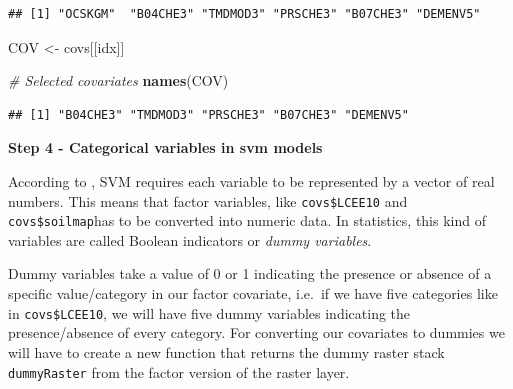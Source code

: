 \documentclass[10pt,b5paper,]{book}
\newenvironment{Shaded}{\begin{snugshade}}{\end{snugshade}}
\newcommand{\CommentTok}[1]{\textcolor[rgb]{0.56,0.35,0.01}{\textit{#1}}}
\newcommand{\DecValTok}[1]{\textcolor[rgb]{0.00,0.00,0.81}{#1}}
\newcommand{\KeywordTok}[1]{\textcolor[rgb]{0.13,0.29,0.53}{\textbf{#1}}}
\newcommand{\NormalTok}[1]{#1}
\newcommand{\OperatorTok}[1]{\textcolor[rgb]{0.81,0.36,0.00}{\textbf{#1}}}
\newcommand{\OtherTok}[1]{\textcolor[rgb]{0.56,0.35,0.01}{#1}}
\newcommand{\StringTok}[1]{\textcolor[rgb]{0.31,0.60,0.02}{#1}}
\theoremstyle{definition}
\theoremstyle{definition}
\theoremstyle{definition}
\theoremstyle{remark}
\begin{document}
\begin{Shaded}
\end{Shaded}

\begin{verbatim}
## [1] "OCSKGM"  "B04CHE3" "TMDMOD3" "PRSCHE3" "B07CHE3" "DEMENV5"
\end{verbatim}

\begin{Shaded}
\begin{Highlighting}[]
\NormalTok{COV <-}\StringTok{ }\NormalTok{covs[[idx]]}

\CommentTok{# Selected covariates}
\KeywordTok{names}\NormalTok{(COV)}
\end{Highlighting}
\end{Shaded}

\begin{verbatim}
## [1] "B04CHE3" "TMDMOD3" "PRSCHE3" "B07CHE3" "DEMENV5"
\end{verbatim}

\textbf{Step 4 - Categorical variables in svm models}

According to \citet{hsu2003practical}, SVM requires each variable to be
represented by a vector of real numbers. This means that factor
variables, like \texttt{covs\$LCEE10} and \texttt{covs\$soilmap}has to
be converted into numeric data. In statistics, this kind of variables
are called Boolean indicators or \emph{dummy variables}.

Dummy variables take a value of 0 or 1 indicating the presence or
absence of a specific value/category in our factor covariate, i.e.~if we
have five categories like in \texttt{covs\$LCEE10}, we will have five
dummy variables indicating the presence/absence of every category. For
converting our covariates to dummies we will have to create a new
function that returns the dummy raster stack \texttt{dummyRaster} from
the factor version of the raster layer.
\end{document}
